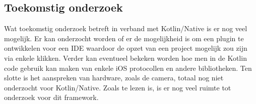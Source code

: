 \documentclass[a0,portrait]{a0poster}
\begin{document}
\begin{multicols}{2}
\section*{Toekomstig onderzoek}
\color{black}
Wat toekomstig onderzoek betreft in verband met Kotlin/Native is er nog veel mogelijk. Er kan onderzocht worden of er de mogelijkheid is om een plugin te ontwikkelen voor een IDE waardoor de opzet van een project mogelijk zou zijn via enkele klikken. Verder kan eventueel bekeken worden hoe men in de Kotlin code gebruik kan maken van enkele iOS protocollen en andere bibliotheken. Ten slotte is het aanspreken van hardware, zoals de camera, totaal nog niet onderzocht voor Kotlin/Native. Zoals te lezen is, is er nog veel ruimte tot onderzoek voor dit framework.


\end{multicols}
\end{document}
